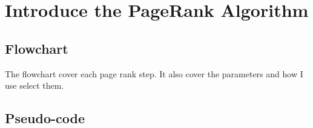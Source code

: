 \documentclass[titlepage,a4paper,12pt,thmsb]{report}
\begin{document}
\chapter{ Introduce the PageRank Algorithm }
\section{ Flowchart }

\begin{center}
\begin{figure}[h]
{\par}
\end{figure}
{}
\end{center}

The flowchart cover each page rank step. It also cover the parameters and how I use select them.

\newpage
\section{ Pseudo-code }
\end{document}
